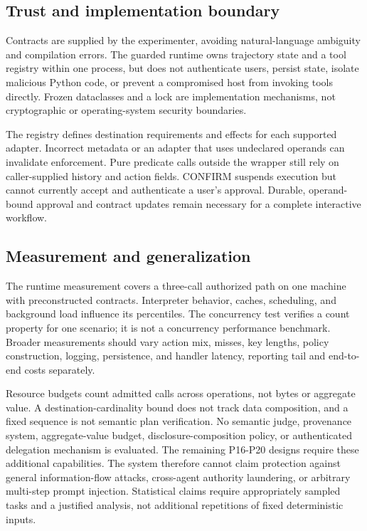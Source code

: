 \documentclass[conference,letterpaper]{IEEEtran}
\begin{document}
\subsection{Trust and implementation boundary}

Contracts are supplied by the experimenter, avoiding natural-language ambiguity and compilation errors. The guarded runtime owns trajectory state and a tool registry within one process, but does not authenticate users, persist state, isolate malicious Python code, or prevent a compromised host from invoking tools directly. Frozen dataclasses and a lock are implementation mechanisms, not cryptographic or operating-system security boundaries.


The registry defines destination requirements and effects for each supported adapter. Incorrect metadata or an adapter that uses undeclared operands can invalidate enforcement. Pure predicate calls outside the wrapper still rely on caller-supplied history and action fields. CONFIRM suspends execution but cannot currently accept and authenticate a user's approval. Durable, operand-bound approval and contract updates remain necessary for a complete interactive workflow.


\subsection{Measurement and generalization}

The runtime measurement covers a three-call authorized path on one machine with preconstructed contracts. Interpreter behavior, caches, scheduling, and background load influence its percentiles. The concurrency test verifies a count property for one scenario; it is not a concurrency performance benchmark. Broader measurements should vary action mix, misses, key lengths, policy construction, logging, persistence, and handler latency, reporting tail and end-to-end costs separately.


Resource budgets count admitted calls across operations, not bytes or aggregate value. A destination-cardinality bound does not track data composition, and a fixed sequence is not semantic plan verification. No semantic judge, provenance system, aggregate-value budget, disclosure-composition policy, or authenticated delegation mechanism is evaluated. The remaining P16-P20 designs require these additional capabilities. The system therefore cannot claim protection against general information-flow attacks, cross-agent authority laundering, or arbitrary multi-step prompt injection. Statistical claims require appropriately sampled tasks and a justified analysis, not additional repetitions of fixed deterministic inputs.
\end{document}
